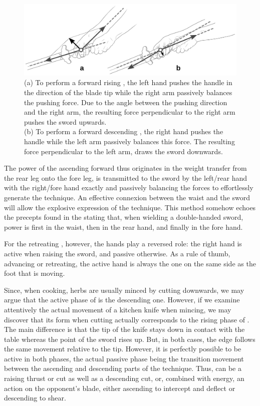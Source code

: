 \begin{figure}[ht]
	\centering
	
	\includegraphics[width=1.00\textwidth]{../../Images/JibenJianfa/Duo/DuoDetail.pdf}
	\caption[Balance of forces in \Duo{}]{(a) To perform a forward rising \Duo{}, the left hand pushes the handle in the direction of the blade tip while the right arm passively balances the pushing force. Due to the angle between the pushing direction and the right arm, the resulting force perpendicular to the right arm pushes the sword upwards.\\
	(b) To perform a forward descending \Duo{}, the right hand pushes the handle while the left arm passively balances this force. The resulting force perpendicular to the left arm, draws the sword downwards.
	}
	\label{fig:duo_detail}
\end{figure} 

The power of the ascending forward \Duo{} thus originates in the weight transfer from the rear leg onto the fore leg, is transmitted to the sword by the left/rear hand with the right/fore hand exactly and passively balancing the forces to effortlessly generate the technique. An effective connexion between the waist and the sword will allow the explosive expression of the \Duo{} technique. 
This method somehow echoes the precepts found in the \JianJing{} stating that, when wielding a double-handed sword, power is first in the waist, then in the rear hand, and finally in the fore hand.

For the retreating \Duo{}, however, the hands play a reversed role: the right hand is active when raising the sword, and passive otherwise. As a rule of thumb, advancing or retreating, the active hand is always the one on the same side as the foot that is moving.

Since, when cooking, herbs are usually minced by cutting downwards, we may argue that the active phase of \Duo{} is the descending one. However, if we examine attentively the actual movement of a kitchen knife when mincing, we may discover that its form when cutting actually corresponds to the rising phase of \Duo{}. The main difference is that the tip of the knife stays down in contact with the table whereas the point of the sword rises up. But, in both cases, the edge follows the same movement relative to the tip. 
However, it is perfectly possible to be active in both phases, the actual passive phase being the transition movement between the ascending and descending parts of the technique. Thus, \Duo{} can be a raising thrust or cut as well as a descending cut, or, combined with \Mo{} energy, an action on the opponent's blade, either ascending to intercept and deflect or descending to shear. 


